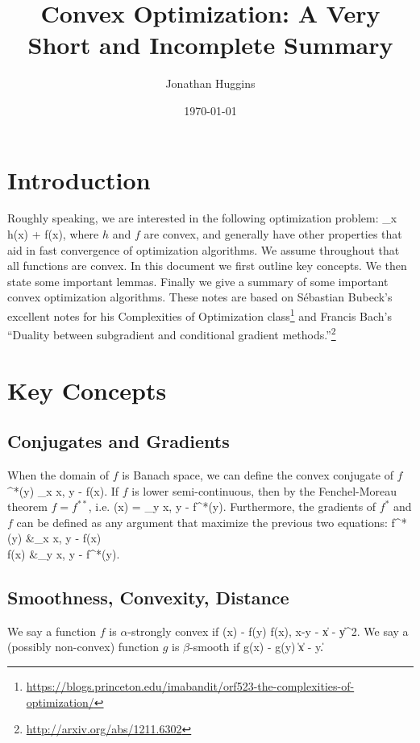 \documentclass[reqno,oneside,a4paper]{amsart}
\newcommand{\ip}[2]{\left\langle #1, #2 \right\rangle}
\def\[#1\]{\begin{align}#1\end{align}}
\begin{document}
\title{Convex Optimization: A Very Short and Incomplete Summary} 
\author{Jonathan Huggins}
\date{\today}

\maketitle

\section{Introduction}

Roughly speaking, we are interested in the following optimization problem:
\[ 
\max_{x} h(x) + f(x),
\]
where $h$ and $f$ are convex, and generally have other properties that aid in fast convergence of optimization algorithms. We assume throughout that all functions are convex. In this document we first outline key concepts. We then state some important lemmas. Finally we give a summary of some important convex optimization algorithms. These notes are based on S\'ebastian Bubeck's excellent notes for his Complexities of Optimization class\footnote{\url{https://blogs.princeton.edu/imabandit/orf523-the-complexities-of-optimization/}} and Francis Bach's ``Duality between subgradient and conditional gradient methods.''\footnote{\url{http://arxiv.org/abs/1211.6302}}

\section{Key Concepts}

\subsection{Conjugates and Gradients}

When the domain of $f$ is Banach space, we can define the convex conjugate of $f$
\[
f^{*}(y)  \max_{x} \ip{x}{y} - f(x).
\]
If $f$ is lower semi-continuous, then by the Fenchel-Moreau theorem $f = f^{**}$, i.e.
\[
f(x) = \max_{y} \ip{x}{y} - f^{*}(y).
\]
Furthermore, the gradients of $f^{*}$ and $f$ can be defined as any argument that maximize the previous two equations:
\[
\partial f^{*}(y) &\in \argmax_{x} \ip{x}{y} - f(x) \\
\partial f(x) &\in \argmax_{y} \ip{x}{y} - f^{*}(y).
\]

\subsection{Smoothness, Convexity, Distance} 
We say a function $f$ is $\alpha$-strongly convex if 
\[
f(x)  - f(y) \le \ip{\partial f(x)}{x-y} - \|x - y\|^{2}.
\]
We say a (possibly non-convex) function $g$ is $\beta$-smooth if 
\[
\|\partial g(x) - \partial g(y) \| \le \beta \| x - y\|.
\]
\end{document}

